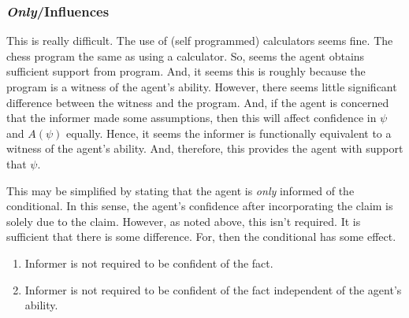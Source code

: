 \documentclass[10pt]{article}
\begin{document}
\subsubsection{\emph{Only}/Influences}
\label{sec:only}

This is really difficult.
The use of (self programmed) calculators seems fine.
The chess program the same as using a calculator.
So, seems the agent obtains sufficient support from program.
And, it seems this is roughly because the program is a witness of the agent's ability.
However, there seems little significant difference between the witness and the program.
And, if the agent is concerned that the informer made some assumptions, then this will affect confidence in \(\psi\) and \(A(\psi)\) equally.
Hence, it seems the informer is functionally equivalent to a witness of the agent's ability.
And, therefore, this provides the agent with support that \(\psi\).

This may be simplified by stating that the agent is \emph{only} informed of the conditional.
In this sense, the agent's confidence after incorporating the claim is solely due to the claim.
However, as noted above, this isn't required.
It is sufficient that there is some difference.
For, then the conditional has some effect.

\begin{enumerate}
\item Informer is not required to be confident of the fact.
\item Informer is not required to be confident of the fact independent of the agent's ability.
\end{enumerate}
\end{document}
